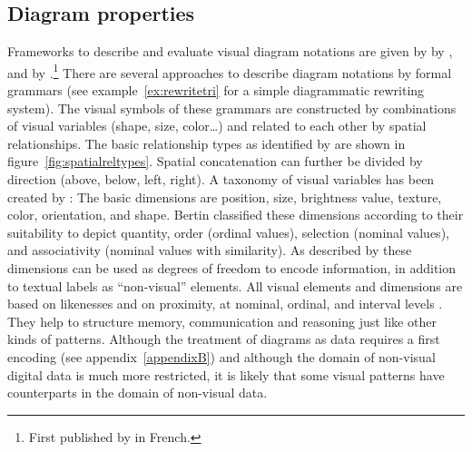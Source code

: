 \subsection{Diagram properties}
\label{sec:diagramproperties}

Frameworks to describe and evaluate visual diagram notations are given by
\textcite{Moody2009} by \textcite{Costagliola2004}, and by
\textcite{Bertin2011}.\footnote{First published by \textcite{Bertin1967} in
French.} There are several approaches to describe diagram notations by formal
grammars (see example~\ref{ex:rewritetri} for a simple diagrammatic rewriting
system). The visual symbols of these grammars are constructed by combinations
of visual variables (shape, size, color\ldots) and related to each other by
spatial relationships. The basic relationship types as identified by
\textcite{Costagliola2004} are shown in figure~\ref{fig:spatialreltypes}.
Spatial concatenation can further be divided by direction (above, below, left,
right). A taxonomy of visual variables has been created by
\textcite{Bertin2011}: The basic dimensions are position, size, brightness
value, texture, color, orientation, and shape. Bertin classified these
dimensions according to their suitability to depict quantity, order (ordinal
values), selection (nominal values), and associativity (nominal values with
similarity).  As described by \textcite{Moody2009} these dimensions can be used
as degrees of freedom to encode information, in addition to textual labels as
``non-visual'' elements. All visual elements and dimensions are based on
likenesses and on proximity, at nominal, ordinal, and interval levels
\cite{Tversky2001}. They help to structure memory, communication and reasoning
just like other kinds of patterns. Although the treatment of diagrams as data
requires a first encoding (see appendix~\ref{appendixB}) and although the
domain of non-visual digital data is much more restricted, it is likely that
some visual patterns have counterparts in the domain of non-visual data.


